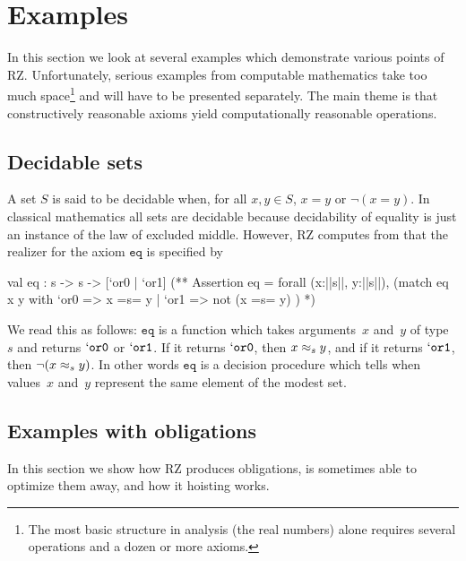 \section{Examples}
\label{sec:examples}

In this section we look at several examples which demonstrate various
points of RZ. Unfortunately, serious examples from computable
mathematics take too much space\footnote{The most basic structure
  in analysis (the real numbers) alone 
  requires several operations and a dozen or more axioms.} and will have to
be presented separately. The main theme is that constructively
reasonable axioms yield computationally reasonable operations.

\subsection{Decidable sets}
\label{sec:decidable-sets}

A set $S$ is said to be decidable when, for all $x, y \in S$, $x = y$
or $\lnot (x = y)$. In classical mathematics all sets are decidable
because decidability of equality is just an instance of the law of
excluded middle. However, RZ computes from
%
%
that the realizer for the axiom $\mathtt{eq}$ is specified by
%
\begin{source}
val eq : s -> s -> [`or0 | `or1]
(**  Assertion eq =
       forall (x:||s||, y:||s||),
         (match eq x y with
            `or0 => x =s= y
          | `or1 => not (x =s= y)
          )
*)
\end{source}
%
We read this as follows: $\mathtt{eq}$ is a function which takes
arguments~$x$ and~$y$ of type~$s$ and returns $\mathtt{`or0}$ or
$\mathtt{`or1}$. If it returns $\mathtt{`or0}$, then $x \approx_s y$, and
if it returns $\mathtt{`or1}$, then $\lnot (x \approx_s y)$. In other
words $\mathtt{eq}$ is a decision procedure which tells when
values~$x$ and~$y$ represent the same element of the modest set.

\subsection{Examples with obligations}
\label{sec:exampl-with-oblig}

In this section we show how RZ produces obligations, is sometimes able
to optimize them away, and how it hoisting works.

